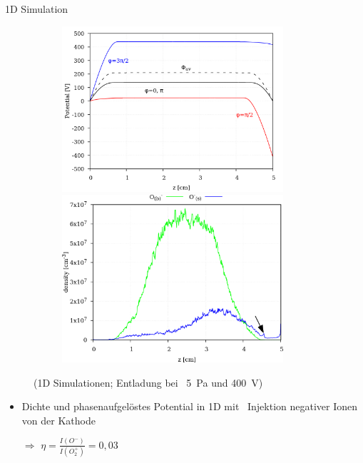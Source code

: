 \documentclass{beamer}
\newcommand{\stichpunkt}[1]{\begin{itemize} \item #1 \end{itemize}}
\newcommand{\stichpfeil}[1]{\begin{itemize} \item[$\Rightarrow$] #1 \end{itemize}}
\begin{document}
\begin{frame}{1D Simulation}
\begin{figure}
\begin{subfigure}{0.49\textwidth}
\begin{overprint}
						\includegraphics[width=0.9\textwidth]
											{figures/results/1D/potential.png}
						\onslide<2>\includegraphics[width=0.9\textwidth]
											{figures/results/1D/densities_Omin.png}
					\end{overprint}
				\end{subfigure}
				\caption{{\scriptsize%
							(1D Simulationen; Entladung bei~
						  	\SI{5}{\pascal} und \SI{400}{\volt})}}
			\end{figure}
			\begin{block}{}
					\stichpunkt{Dichte und phasenaufgelöstes Potential in 1D mit~%
								Injektion negativer Ionen von der Kathode}%
					\stichpfeil{$\eta = \frac{I(O^{-})}{I(O^{+}_{2})} = 0,03$}
			\end{block}
		\end{frame}
\end{document}
